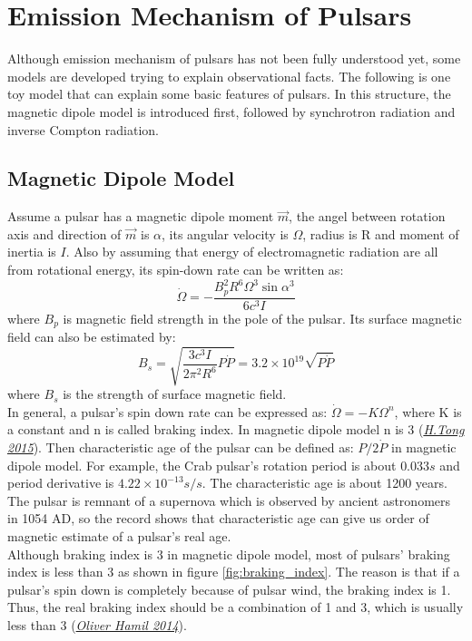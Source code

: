 \documentclass[12pt]{report}
\begin{document}
    \section{Emission Mechanism of Pulsars}
            Although emission mechanism of pulsars has not been fully understood yet, some models are developed 
            trying to explain observational facts. The following is one toy model that can explain some basic 
            features of pulsars. In this structure, the magnetic dipole model is introduced first, followed by 
            synchrotron radiation and inverse Compton radiation. 
       
        \subsection{Magnetic Dipole Model}
            Assume a pulsar has a magnetic dipole moment $\vec{m}$, the angel between rotation axis and 
            direction of 
            $\vec{m}$ is $\alpha$, its angular velocity is $\Omega$, radius is R and moment of inertia is $I$. 
            Also by 
            assuming that energy of electromagnetic radiation are all from rotational energy, its spin-down 
            rate can be written 
            as: 
            $$
                \dot{\Omega}=-\frac{B_p^2 R^6 \Omega^3 \sin{\alpha}^3}{6c^3I}
            $$
            where $B_p$ is magnetic field strength in the pole of the pulsar. Its surface magnetic field can 
            also be estimated
            by:
            $$
                B_s=\sqrt{\frac{3c^3I}{2\pi^2R^6}P\dot{P}}=3.2\times 10^{19}\sqrt{P\dot{P}}
            $$
            where $B_s$ is the strength of surface magnetic field. \\
            \indent In general, a pulsar's spin down rate can be expressed as: $\dot{\Omega}=-K\Omega^{n}$, 
            where K is a 
            constant and n is called braking index. In magnetic dipole model n is 3 \hypersetup{urlcolor= red}
            (\href{https://arxiv.org/pdf/1506.04605.pdf}{\textit{H.Tong 2015}}). Then 
            characteristic age of the pulsar can be defined as: $P/2\dot{P}$ in magnetic dipole model. 
            For example, the Crab 
            pulsar's rotation period is about $0.033s$ and period derivative is $4.22\times 10^{-13}s/s$. 
            The characteristic 
            age is about 1200 years. The pulsar is remnant of a supernova which is observed by ancient 
            astronomers in 1054 
            AD, so the record shows that characteristic age can give us order of magnetic estimate of a 
            pulsar's real age. \\
            \indent 
            Although braking index is 3 in magnetic dipole model, most of pulsars' braking index is less than 3 as 
            shown in figure \ref{fig:braking_index}. The reason is that if a pulsar's spin down is completely because
            of pulsar wind, the braking index is 1. Thus, the real braking index should be a combination of 1 and 3,
            which is usually less than 3  \hypersetup{urlcolor= red}
            (\href{http://www.ift.uni.wroc.pl/~csqcdiv/talks/26092014/ohamil_csqcdiv.pdf}
            {\textit{Oliver Hamil 2014}}).
            
\end{document}
